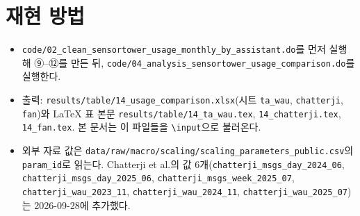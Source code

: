 \documentclass[11pt]{article}
\begin{document}
\section{재현 방법}

\begin{itemize}
  \item \texttt{code/02\_clean\_sensortower\_usage\_monthly\_by\_assistant.do}를 먼저 실행해 ⑨--⑫를 만든 뒤, \texttt{code/04\_analysis\_sensortower\_usage\_comparison.do}를 실행한다.
  \item 출력: \texttt{results/table/14\_usage\_comparison.xlsx}(시트 \texttt{ta\_wau}, \texttt{chatterji}, \texttt{fan})와 LaTeX 표 본문 \texttt{results/table/14\_ta\_wau.tex}, \texttt{14\_chatterji.tex}, \texttt{14\_fan.tex}. 본 문서는 이 파일들을 \texttt{\textbackslash input}으로 불러온다.
  \item 외부 자료 값은 \texttt{data/raw/macro/scaling/scaling\_parameters\_public.csv}의 \texttt{param\_id}로 읽는다. Chatterji et al.의 값 6개(\texttt{chatterji\_msgs\_day\_2024\_06}, \texttt{chatterji\_msgs\_day\_2025\_06}, \texttt{chatterji\_msgs\_week\_2025\_07}, \texttt{chatterji\_wau\_2023\_11}, \texttt{chatterji\_wau\_2024\_11}, \texttt{chatterji\_wau\_2025\_07})는 2026-09-28에 추가했다.
\end{itemize}

\printbibliography[title={참고문헌}]
\end{document}
